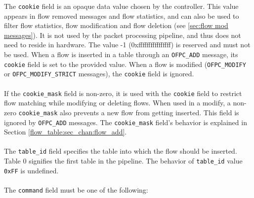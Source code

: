 
The \verb|cookie| field is an opaque data value chosen by the controller.  This value appears in flow removed messages and flow statistics, and can also be used to filter flow statistics, flow modification and flow deletion (see \ref{sec:flow mod messages}). It is not used by the packet processing pipeline, and thus does not need to reside in hardware.  The value -1 (0xffffffffffffffff) is reserved and must not be used. When a flow is inserted in a table through an \verb|OFPC_ADD| message, its \verb|cookie| field is set to the provided value. When a flow is modified (\verb|OFPC_MODIFY| or \verb|OFPC_MODIFY_STRICT| messages), the \verb|cookie| field is ignored.
\\\\
If the \verb|cookie_mask| field is non-zero, it is used with the \verb|cookie| field to restrict flow matching while modifying or deleting flows.  When used in a modify, a non-zero \verb|cookie_mask| also prevents a new flow from getting inserted. This field is ignored by \verb|OFPC_ADD| messages. The \verb|cookie_mask| field's behavior is explained in Section \ref{flow_table:sec_chan:flow_add}.
\\\\
The \verb|table_id| field specifies the table into which the flow should be inserted.
Table 0 signifies the first table in the pipeline. The behavior of \verb|table_id| value \verb|0xFF| is undefined.
\\\\
The \verb|command| field must be one of the following:

